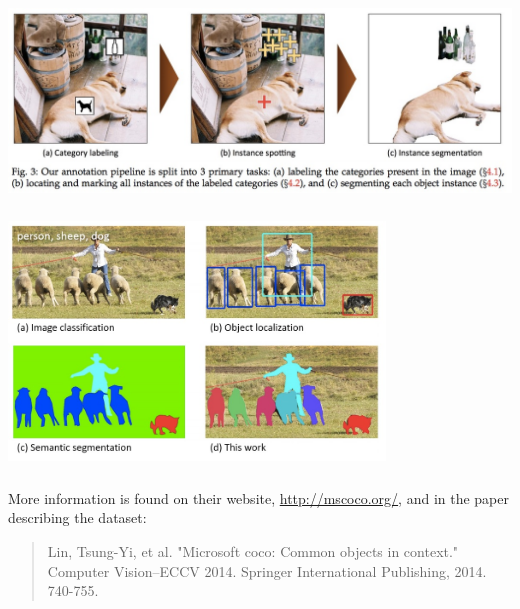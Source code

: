 \documentclass[xetex,mathserif,serif,aspectratio=169]{beamer}
\begin{document}
\begin{frame}[fragile] \frametitle{} \oldB \small

\begin{center}
\includegraphics[width=\textwidth]{img/segmentMSCOCO.jpg}
\end{center}

\end{frame}

\begin{frame}[fragile] \frametitle{} \oldB \small

\begin{center}
\includegraphics[width=0.75\textwidth]{img/segmentMSCOCO2.jpg}
\end{center}

\end{frame}

\begin{frame}[fragile] \frametitle{} \oldB \small

More information is found on their website, \url{http://mscoco.org/},
and in the paper describing the dataset:
\begin{quote}
Lin, Tsung-Yi, et al. "Microsoft coco: Common objects in context."
Computer Vision–ECCV 2014. Springer International Publishing, 2014. 740-755.
\end{quote}

\end{frame}
\end{document}
